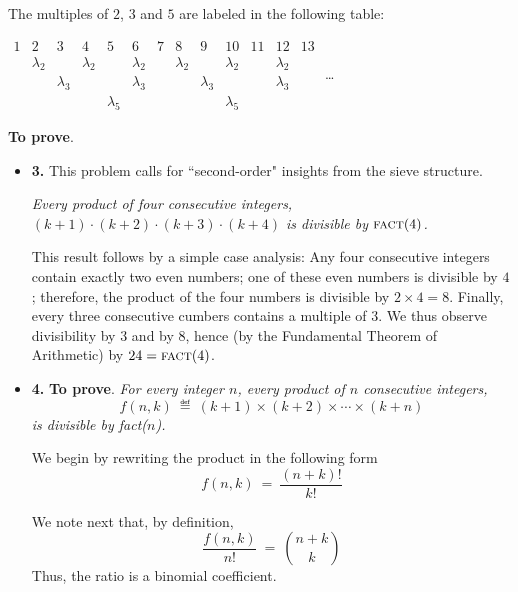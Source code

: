 \begin{itemize}
\begin{itemize}
\medskip

The multiples of $2$, $3$ and $5$ are labeled in the following table:

\medskip

\hspace*{.25in}
$\begin{array}{c|c|c|c|c|c|c|c|c|c|c|c|c}
1 & 2 & 3 & 4 & 5 & 6 & 7 & 8 & 9 & 10 & 11 & 12 & 13 \\
 & \lambda_2 & & \lambda_2 & & \lambda_2 & & \lambda_2 & & \lambda_2 & & \lambda_2 & \\
 & & \lambda_3 & &  & \lambda_3 & & & \lambda_3 & & & \lambda_3 & \\
 & & & & \lambda_5 & & & & & \lambda_5 & & & 
\end{array}$ \ldots

\bigskip

{\bf To prove}.
     \begin{itemize}
     \item 
     {\bf 3.}
This problem calls for ``second-order" insights from the sieve structure.

\smallskip

{\em Every product of four consecutive integers, $(k+1) \cdot (k+2) \cdot (k+3) \cdot (k+4)$ is divisible by $\mbox{\sc fact}(4)$.}

\smallskip

This result follows by a simple case analysis:  Any four consecutive integers contain exactly two even numbers; one of these even numbers is divisible by $4$; therefore, the product of the four numbers is divisible by $2 \times 4 = 8$.  Finally, every three consecutive cumbers contains a multiple of $3$.  We thus observe divisibility by $3$ and by $8$, hence (by the Fundamental Theorem of Arithmetic) by $24 = \mbox{\sc fact}(4)$.

    \medskip\item
     {\bf 4.}
{\bf To prove}. {\em 
For every integer $n$, every product of $n$ consecutive integers,
\[ f(n,k) \ \eqdef \ (k+1) \times (k+2) \times \cdots \times (k+n) \]
is divisible by {\sc fact}($n$).}

\medskip

We begin by rewriting the product in the following form
\[ f(n,k) \ = \ \frac{(n+k)!}{k!} \]

\smallskip

We note next that, by definition, 
\[ \frac{f(n,k)}{n!} \ = \ {n+k \choose k} \]
Thus, the ratio is a binomial coefficient.

\smallskip


\end{itemize}
\end{itemize}
\end{itemize}
